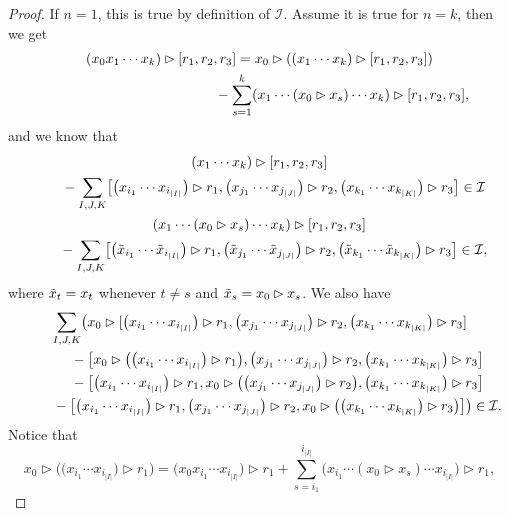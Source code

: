 \documentclass[pdftex]{sigma}
\numberwithin{equation}{section}
\begin{document}
\begin{proof}
If $n=1$, this is true by definition of $\mathcal{I}$. Assume it is true for $n=k$, then we get
\begin{gather*}
 (x_0 x_1 \cdots x_k) \rhd [r_1, r_2, r_3] = x_0 \rhd ( (x_1 \cdots x_k) \rhd [r_1, r_2 , r_3] ) \\ \hphantom{(x_0 x_1 \cdots x_k) \rhd [r_1, r_2, r_3] =}{}
 - \sum_{s=1}^k (x_1 \cdots (x_0 \rhd x_s) \cdots x_k) \rhd [r_1, r_2, r_3],
\end{gather*}
and we know that
\begin{gather*}
 (x_1 \cdots x_k) \rhd [r_1, r_2, r_3] \\
\qquad {}- \sum_{I,J,K} \bigl[\bigl(x_{i_1} \cdots x_{i_{|I|}}\bigr) \rhd r_1, \bigl(x_{j_1} \cdots x_{j_{|J|}}\bigr) \rhd r_2, \bigl(x_{k_1} \cdots x_{k_{|K|}}\bigr) \rhd r_3\bigr] \in \mathcal{I} \\
 (x_1 \cdots (x_0 \rhd x_s) \cdots x_k) \rhd [r_1, r_2, r_3] \\
\qquad {}- \sum_{I,J,K} \bigl[\bigl(\Tilde{x}_{i_1} \cdots \Tilde{x}_{i_{|I|}}\bigr) \rhd r_1, \bigl(\Tilde{x}_{j_1} \cdots \Tilde{x}_{j_{|J|}}\bigr) \rhd r_2, \bigl(\Tilde{x}_{k_1} \cdots \Tilde{x}_{k_{|K|}}\bigr) \rhd r_3\bigr] \in \mathcal{I},
\end{gather*}
where $\Tilde{x}_t=x_t$ whenever $t\neq s$ and $\Tilde{x}_s=x_0 \rhd x_s$. We also have
\begin{gather*}
 \sum_{I,J,K} \bigl( x_0 \rhd [\bigl(x_{i_1} \cdots x_{i_{|I|}}\bigr) \rhd r_1, \bigl(x_{j_1} \cdots x_{j_{|J|}}\bigr) \rhd r_2, \bigl(x_{k_1} \cdots x_{k_{|K|}}\bigr) \rhd r_3] \\ \hphantom{\sum_{I,J,K}\bigl(}{}
 - \bigl[x_0 \rhd \bigl( \bigl(x_{i_1} \cdots x_{i_{|I|}}\bigr) \rhd r_1 \bigr), \bigl(x_{j_1} \cdots x_{j_{|J|}}\bigr) \rhd r_2, \bigl(x_{k_1} \cdots x_{k_{|K|}}\bigr) \rhd r_3\bigr] \\ \hphantom{\sum_{I,J,K}\bigl(}{}
 - \bigl[\bigl(x_{i_1} \cdots x_{i_{|I|}}\bigr) \rhd r_1, x_0 \rhd \bigl( \bigl(x_{j_1} \cdots x_{j_{|J|}}\bigr) \rhd r_2\bigr) , \bigl(x_{k_1} \cdots x_{k_{|K|}}\bigr) \rhd r_3\bigr] \\ \hphantom{\sum_{I,J,K}\bigl(}{}
 - \bigl[\bigl(x_{i_1} \cdots x_{i_{|I|}}\bigr) \rhd r_1, \bigl(x_{j_1} \cdots x_{j_{|J|}}\bigr) \rhd r_2, x_0 \rhd \bigl( \bigl(x_{k_1} \cdots x_{k_{|K|}}\bigr) \rhd r_3 \bigr) \bigr] \bigr) \in \mathcal{I}.
\end{gather*}
Notice that
\[
x_0 \rhd \bigl( \bigl(x_{i_1} \cdots x_{i_{|I|}}\bigr) \rhd r_1 \bigr) = \bigl(x_0x_{i_1} \cdots x_{i_{|I|}}\bigr) \rhd r_1 + \sum_{s=i_1}^{i_{|I|}} \bigl(x_{i_1} \cdots (x_0 \rhd x_s) \cdots x_{i_{|I|}}\bigr) \rhd r_1,
\]
\end{proof}
\end{document}
